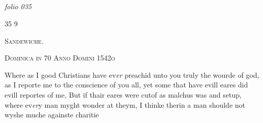 \documentclass[12pt, a4paper]{book}
\begin{document}
 


            
            
\dotfill
						\newpage {} \subsection*{}  \subsection*{}  \subsection*{}  \subsection*{}

\textit{folio 035}



 \begin{flushright}{\color{Mahogany}35} 9\end{flushright}
 

	
				\begin{center} \begin{large} {\scshape Sandewiche. } \end{large} \end{center}
			
               
                  
				\begin{center}  {\scshape Dominica in 70 Anno Domini 1542o}  \end{center}
			

	
				\marginpar[\vspace{0.5cm}{\textcolor{Gray}{n}}]{}
			
	
		\ifthenelse{\isodd{\thepage}}
		{\reversemarginpar}
		{\normalmarginpar}
		Where as I good Christians have ev\textit{er} preachid unto you
 truly the wourde of god, as I reporte me to the conscience
 of you all, yet some that have evill eares did evill reportes
 of me, But if thair eares were cutof as malchus was
 and setup, where ev\textit{er}y man myght wonder at theym, I
 thinke therin a man shoulde not wyshe muche againste
 charitie
\end{document}

